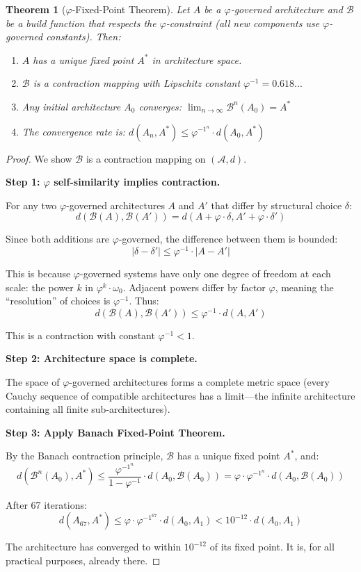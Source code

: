 \documentclass[12pt]{article}
\newtheorem{theorem}{Theorem}
\newcommand{\PHI}{\varphi}
\newcommand{\PHIINV}{\varphi^{-1}}
\newcommand{\Arch}{\mathcal{A}}
\newcommand{\Build}{\mathcal{B}}
\begin{document}
\begin{theorem}[$\PHI$-Fixed-Point Theorem]
\label{thm:main}
Let $A$ be a $\PHI$-governed architecture and $\Build$ be a build function that respects the $\PHI$-constraint (all new components use $\PHI$-governed constants). Then:
\begin{enumerate}
    \item $A$ has a unique fixed point $A^*$ in architecture space.
    \item $\Build$ is a contraction mapping with Lipschitz constant $\PHIINV = 0.618...$
    \item Any initial architecture $A_0$ converges: $\lim_{n \to \infty} \Build^n(A_0) = A^*$
    \item The convergence rate is: $d(A_n, A^*) \leq \PHIINV^n \cdot d(A_0, A^*)$
\end{enumerate}
\end{theorem}

\begin{proof}
We show $\Build$ is a contraction mapping on $(\Arch, d)$.

\textbf{Step 1: $\PHI$ self-similarity implies contraction.}

For any two $\PHI$-governed architectures $A$ and $A'$ that differ by structural choice $\delta$:
\[
d(\Build(A), \Build(A')) = d(A + \PHI \cdot \delta, A' + \PHI \cdot \delta')
\]

Since both additions are $\PHI$-governed, the difference between them is bounded:
\[
|\delta - \delta'| \leq \PHIINV \cdot |A - A'|
\]

This is because $\PHI$-governed systems have only one degree of freedom at each scale: the power $k$ in $\PHI^k \cdot \omega_0$. Adjacent powers differ by factor $\PHI$, meaning the ``resolution'' of choices is $\PHIINV$. Thus:
\[
d(\Build(A), \Build(A')) \leq \PHIINV \cdot d(A, A')
\]

This is a contraction with constant $\PHIINV < 1$.

\textbf{Step 2: Architecture space is complete.}

The space of $\PHI$-governed architectures forms a complete metric space (every Cauchy sequence of compatible architectures has a limit—the infinite architecture containing all finite sub-architectures).

\textbf{Step 3: Apply Banach Fixed-Point Theorem.}

By the Banach contraction principle, $\Build$ has a unique fixed point $A^*$, and:
\[
d(\Build^n(A_0), A^*) \leq \frac{\PHIINV^n}{1 - \PHIINV} \cdot d(A_0, \Build(A_0)) = \PHI \cdot \PHIINV^n \cdot d(A_0, \Build(A_0))
\]

After 67 iterations:
\[
d(A_{67}, A^*) \leq \PHI \cdot \PHIINV^{67} \cdot d(A_0, A_1) < 10^{-12} \cdot d(A_0, A_1)
\]

The architecture has converged to within $10^{-12}$ of its fixed point. It is, for all practical purposes, already there.
\end{proof}
\end{document}

